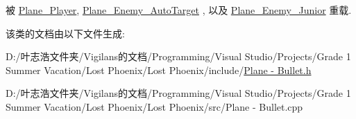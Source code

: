 被 \hyperlink{class_plane___player_ae68c08ce11fad9fd164c00eb4db6b348}{Plane\+\_\+\+Player}, \hyperlink{class_plane___enemy___auto_target_a79e6eda540d282205ce6151ae0b304ca}{Plane\+\_\+\+Enemy\+\_\+\+Auto\+Target} , 以及 \hyperlink{class_plane___enemy___junior_a262143737ed740f65063dbcbc5970f55}{Plane\+\_\+\+Enemy\+\_\+\+Junior} 重载.



该类的文档由以下文件生成\+:\begin{DoxyCompactItemize}
\item 
D\+:/叶志浩文件夹/\+Vigilans的文档/\+Programming/\+Visual Studio/\+Projects/\+Grade 1 Summer Vacation/\+Lost Phoenix/\+Lost Phoenix/include/\hyperlink{_plane_01-_01_bullet_8h}{Plane -\/ Bullet.\+h}\item 
D\+:/叶志浩文件夹/\+Vigilans的文档/\+Programming/\+Visual Studio/\+Projects/\+Grade 1 Summer Vacation/\+Lost Phoenix/\+Lost Phoenix/src/Plane -\/ Bullet.\+cpp\end{DoxyCompactItemize}
